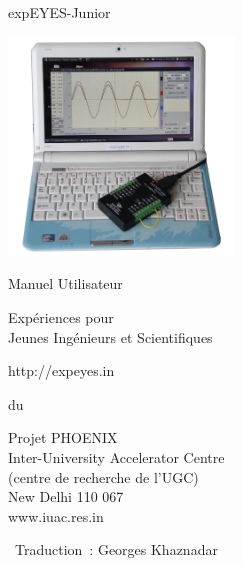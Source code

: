 \documentclass[12pt,a4paper]{report}
\begin{document}
\begin{titlepage}
\thispagestyle{empty}

\vspace{0.2in}

\begin{center}
{\Huge{}expEYES-Junior}
\par\end{center}{\Huge \par}

\begin{center}
\includegraphics[width=6cm]{../../pics/ej-with-pc-lr.jpg}
\par\end{center}

\begin{center}
{\large{}Manuel Utilisateur }
\par\end{center}{\large \par}

\begin{center}
{\LARGE{}Expériences pour}\\
{\LARGE{} Jeunes Ingénieurs et Scientifiques}
\par\end{center}{\LARGE \par}

\begin{center}
http://expeyes.in
\par\end{center}

\begin{center}
du
\par\end{center}

\begin{center}
Projet PHOENIX\\
Inter-University Accelerator Centre \\
(centre de recherche de l'UGC)\\
New Delhi 110 067\\
www.iuac.res.in
\par\end{center}

\vfill

{~\hfill \small Traduction : Georges Khaznadar}

\end{titlepage}
\end{document}
